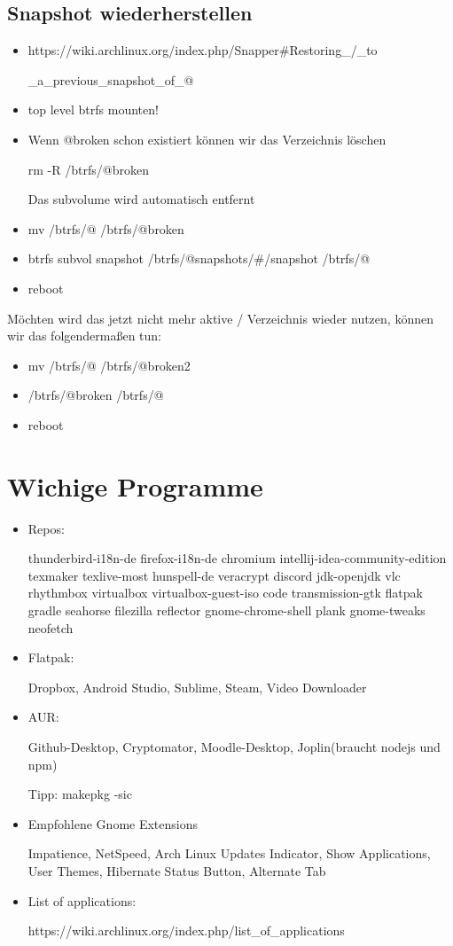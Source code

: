 \documentclass[11pt,a4paper]{article}
\begin{document}
\subsection{Snapshot wiederherstellen}
\begin{itemize}
\item https://wiki.archlinux.org/index.php/Snapper\#Restoring\_/\_to

\_a\_previous\_snapshot\_of\_@
\item top level btrfs mounten!
\item Wenn @broken schon existiert können wir das Verzeichnis löschen

rm -R /btrfs/@broken

Das subvolume wird automatisch entfernt
\item mv /btrfs/@ /btrfs/@broken
\item btrfs subvol snapshot /btrfs/@snapshots/\#/snapshot /btrfs/@
\item reboot
\end{itemize}
Möchten wird das jetzt nicht mehr aktive / Verzeichnis wieder nutzen, können wir das folgendermaßen tun:
\begin{itemize}
\item mv /btrfs/@ /btrfs/@broken2
\item /btrfs/@broken /btrfs/@
\item reboot
\end{itemize}


 
\section{Wichige Programme}
\begin{itemize}
\item Repos:

thunderbird-i18n-de firefox-i18n-de chromium intellij-idea-community-edition texmaker texlive-most hunspell-de veracrypt discord jdk-openjdk vlc rhythmbox virtualbox virtualbox-guest-iso code transmission-gtk flatpak gradle seahorse filezilla reflector gnome-chrome-shell plank gnome-tweaks neofetch
\item Flatpak:

Dropbox, Android Studio, Sublime, Steam, Video Downloader
\item AUR:

Github-Desktop, Cryptomator, Moodle-Desktop, Joplin(braucht nodejs und npm)

Tipp: makepkg -sic

\item Empfohlene Gnome Extensions

Impatience, NetSpeed, Arch Linux Updates Indicator, Show Applications, User Themes, Hibernate Status Button, Alternate Tab

\item List of applications:

https://wiki.archlinux.org/index.php/list\_of\_applications

\end{itemize}
\end{document}
